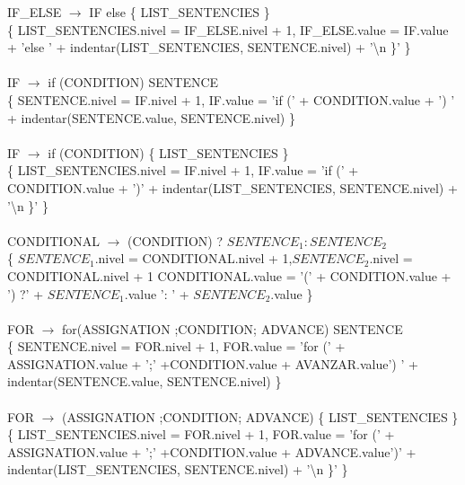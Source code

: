 \documentclass[10pt,a4paper]{article}
\begin{document}
IF\_ELSE $\rightarrow$ IF else \{ LIST\_SENTENCIES \}  \\

\{ LIST\_SENTENCIES.nivel = IF\_ELSE.nivel + 1, IF\_ELSE.value = IF.value + 'else {' + indentar(LIST\_SENTENCIES, SENTENCE.nivel) + '\textbackslash{}n \}' \} \\ \\


IF $\rightarrow$ if (CONDITION) SENTENCE   \\

\{ SENTENCE.nivel = IF.nivel + 1, IF.value = 'if (' + CONDITION.value + ') ' + indentar(SENTENCE.value, SENTENCE.nivel) \}  \\ \\

IF $\rightarrow$ if (CONDITION) \{ LIST\_SENTENCIES \}  \\

\{ LIST\_SENTENCIES.nivel = IF.nivel + 1, IF.value = 'if (' + CONDITION.value + '){' + indentar(LIST\_SENTENCIES, SENTENCE.nivel) + '\textbackslash{}n \}' \} \\ \\


CONDITIONAL $\rightarrow$ (CONDITION) ? $SENTENCE_{1} : SENTENCE_{2}$  \\

\{ $SENTENCE_{1}$.nivel = CONDITIONAL.nivel + 1,$SENTENCE_{2}$.nivel = CONDITIONAL.nivel + 1 CONDITIONAL.value = '(' + CONDITION.value + ') ?' + $SENTENCE_{1}$.value ': '  + $SENTENCE_{2}$.value \} \\ \\

FOR $\rightarrow$ for(ASSIGNATION ;CONDITION; ADVANCE) SENTENCE  \\

\{ SENTENCE.nivel = FOR.nivel + 1, FOR.value = 'for (' + ASSIGNATION.value + ';' +CONDITION.value + AVANZAR.value') ' + indentar(SENTENCE.value, SENTENCE.nivel) \} \\ \\


FOR $\rightarrow$ (ASSIGNATION ;CONDITION; ADVANCE) \{ LIST\_SENTENCIES \} \\ 

\{ LIST\_SENTENCIES.nivel = FOR.nivel + 1, FOR.value = 'for (' + ASSIGNATION.value + ';' +CONDITION.value + ADVANCE.value'){' + indentar(LIST\_SENTENCIES, SENTENCE.nivel) + '\textbackslash{}n \}' \} \\ \\


}}}
\end{document}
